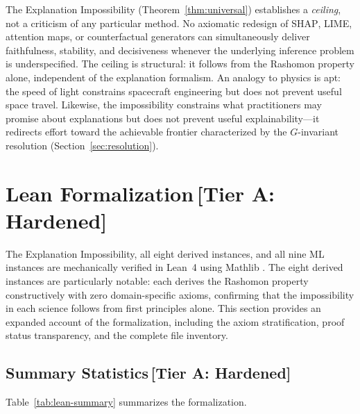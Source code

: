 \documentclass[11pt,a4paper]{article}
\newcommand{\SHAP}{\textsc{SHAP}}
\begin{document}
The Explanation Impossibility (Theorem~\ref{thm:universal}) establishes
a \emph{ceiling}, not a criticism of any particular method.  No axiomatic
redesign of \SHAP{}, LIME, attention maps, or counterfactual generators can
simultaneously deliver faithfulness, stability, and decisiveness whenever the
underlying inference problem is underspecified.  The ceiling is structural: it
follows from the Rashomon property alone, independent of the explanation
formalism.  An analogy to physics is apt: the speed of light constrains
spacecraft engineering but does not prevent useful space travel.  Likewise, the
impossibility constrains what practitioners may promise about explanations but
does not prevent useful explainability---it redirects effort toward the
achievable frontier characterized by the $G$-invariant resolution
(Section~\ref{sec:resolution}).

\section{Lean Formalization\,\textnormal{\normalsize[Tier A: Hardened]}}
\label{sec:lean}

The Explanation Impossibility, all eight derived instances, and all nine ML
instances are mechanically verified in Lean~4 \citep{demoura2021lean4} using
Mathlib \citep{mathlib2020}.  The eight derived instances are particularly
notable: each derives the Rashomon property constructively with zero domain-specific axioms,
confirming that the impossibility in each science follows from first
principles alone.  This section provides an expanded account of the
formalization, including the axiom stratification, proof status transparency,
and the complete file inventory.

\subsection{Summary Statistics\,\textnormal{\normalsize[Tier A: Hardened]}}

Table~\ref{tab:lean-summary} summarizes the formalization.
\end{document}
